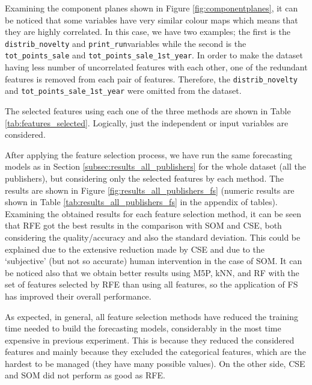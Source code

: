 \documentclass[a4paper,10pt,twocolumn,preprint,3p]{elsarticle}
\begin{document}
Examining the component planes shown in Figure \ref{fig:componentplanes}, it can be noticed that some variables have very similar colour maps which means that they are highly correlated. In this case, we have two examples; the first is the \texttt{distrib\_novelty} and \texttt{print\_run}variables while the second is the \texttt{tot\_points\_sale} and \texttt{tot\_points\_sale\_1st\_year}. In order to make the dataset having less number of uncorrelated features with each other, one of the redundant features is removed from each pair of features. Therefore, the \texttt{distrib\_novelty} and \texttt{tot\_points\_sale\_1st\_year} were omitted from the dataset.


The selected features using each one of the three methods are shown in 
Table \ref{tab:features_selected}.
Logically, just the independent or input variables are considered.



After applying the feature selection process, we have run the same
forecasting models as in Section \ref{subsec:results_all_publishers}
for the whole dataset (all the publishers), but considering only the
selected features by each method. 
The results are shown in Figure \ref{fig:results_all_publishers_fs} 
(numeric results are shown in Table \ref{tab:results_all_publishers_fs}
in the appendix of tables).
Examining the obtained results for each feature selection method, 
it can be seen that RFE got the best results in the comparison with SOM and CSE, both considering the quality/accuracy and also the standard deviation.
This could be explained due to the extensive reduction made by CSE and due to 
the `subjective' (but not so accurate) human intervention in the case of SOM. 
It can be noticed also that we obtain better results using M5P, kNN, and RF with the set of features selected by RFE than using all features, so the application of FS has improved their overall performance.

As expected, in general, all feature selection methods have reduced the training 
time needed to build the forecasting models, considerably in the most time expensive in previous experiment. This is because they reduced the 
considered features and mainly because they excluded the categorical features, 
which are the hardest to be managed (they have many possible values). 
On the other side, CSE and SOM did not perform as good as RFE. 


\end{document}
